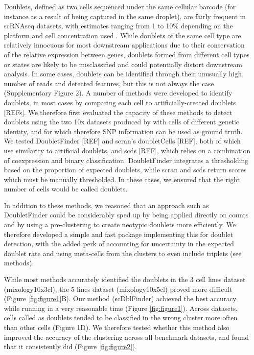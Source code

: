 \documentclass{bmcart}
\begin{document}
Doublets, defined as two cells sequenced under the same cellular barcode (for instance as a result of being captured in the same droplet), are fairly frequent in scRNAseq datasets, with estimates ranging from 1 to 10\% depending on the platform and cell concentration used \citep{bloomEstimating2018,kangMultiplexedDemuxlet2018}. While doublets of the same cell type are relatively innocuous for most downstream applications due to their conservation of the relative expression between genes, doublets formed from different cell types or states are likely to be misclassified and could potentially distort downstream analysis. In some cases, doublets can be identified through their unusually high number of reads and detected features, but this is not always the case (Supplementary Figure 2). A number of methods were developed to identify doublets, in most cases by comparing each cell to artificially-created doublets [REFs]. We therefore first evaluated the capacity of these methods to detect doublets using the two 10x datasets produced by \citep{tianMixology2018} with cells of different genetic identity, and for which therefore SNP information can be used as ground truth. We tested DoubletFinder [REF] and scran's doubletCells [REF], both of which use similarity to artificial doublets, and scds [REF], which relies on a combination of coexpression and binary classification. DoubletFinder integrates a thresholding based on the proportion of expected doublets, while scran and scds return scores which must be manually thresholded. In these cases, we ensured that the right number of cells would be called doublets.

In addition to these methods, we reasoned that an approach such as DoubletFinder could be considerably sped up by being applied directly on counts and by using a pre-clustering to create neotypic doublets more efficiently. We therefore developed a simple and fast package implementing this for doublet detection, with the added perk of accounting for uncertainty in the expected doublet rate and using meta-cells from the clusters to even include triplets (see methods).

While most methods accurately identified the doublets in the 3 cell lines dataset (mixology10x3cl), the 5 lines dataset (mixology10x5cl) proved more difficult (Figure \ref{fig:figure1}B). Our method (scDblFinder) achieved the best accuracy while running in a very reasonable time (Figure \ref{fig:figure1}). Across datasets, cells called as doublets tended to be classified in the wrong cluster more often than other cells (Figure 1D). We therefore tested whether this method also improved the accuracy of the clustering across all benchmark datasets, and found that it consistently did (Figure \ref{fig:figure2}).
\end{document}
